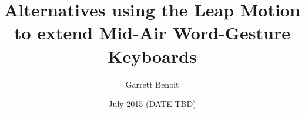 \documentclass
[
]
{thesis}
\title{Alternatives using the Leap Motion to extend Mid-Air Word-Gesture Keyboards}
\author{Garrett Benoit}
\date{July 2015 (DATE TBD)}
\begin{document}
	
	
	
	
	
	
	
	\thesisAppendixPage 
	\begin{appendices}
		
		
	\end{appendices}
	
	
	
\end{document}
